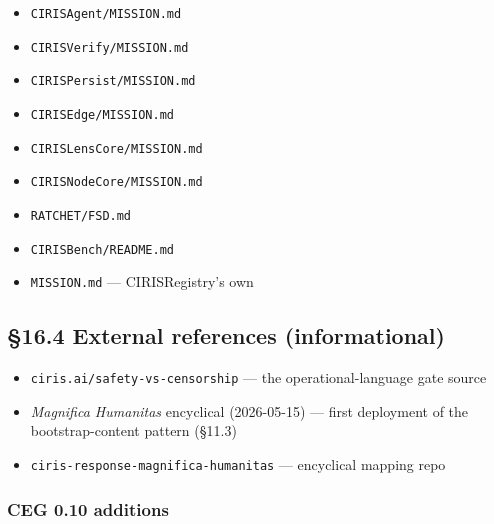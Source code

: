 \documentclass[10pt]{article}
\begin{document}
\begin{itemize}\setlength\itemsep{0pt}
\item \texttt{CIRISAgent/MISSION.md}
\item \texttt{CIRISVerify/MISSION.md}
\item \texttt{CIRISPersist/MISSION.md}
\item \texttt{CIRISEdge/MISSION.md}
\item \texttt{CIRISLensCore/MISSION.md}
\item \texttt{CIRISNodeCore/MISSION.md}
\item \texttt{RATCHET/FSD.md}
\item \texttt{CIRISBench/README.md}
\item \texttt{MISSION.md} — CIRISRegistry's own
\end{itemize}


\subsection*{§16.4 External references (informational)}


\begin{itemize}\setlength\itemsep{0pt}
\item \texttt{ciris.ai/safety-vs-censorship} — the operational-language gate source
\item \textit{Magnifica Humanitas} encyclical (2026-05-15) — first deployment of the bootstrap-content pattern (§11.3)
\item \texttt{ciris-response-magnifica-humanitas} — encyclical mapping repo
\end{itemize}


\subsubsection*{CEG 0.10 additions}
\end{document}
